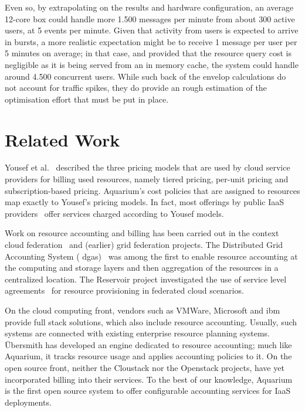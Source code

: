 \documentclass[letterpaper,twocolumn,10pt]{article}
\begin{document}
Even so, by extrapolating on the results and hardware configuration, an average
12-core box could handle more 1.500 messages per minute from about 300 active
users, at 5 events per minute. Given that activity from users is expected to
arrive in bursts, a more realistic expectation might be to receive 1 message
per user per 5 minutes on average; in that case, and provided that the resource
query cost is negligible as it is being served from an in memory cache, the
system could handle around 4.500 concurrent users. While such back of the
envelop calculations do not account for traffic spikes, they do provide an
rough estimation of the optimisation effort that must be put in place. 

\section{Related Work}

Yousef et al.~\cite{Youse08} described the three pricing models that
are used by cloud service providers for billing used resources, namely
tiered pricing, per-unit pricing and subscription-based pricing.
Aquarium's cost policies that are assigned to resources map exactly to
Yousef's pricing models. In fact, most offerings by public IaaS
providers~\cite{Azure12, Amaz12} offer services charged according to
Yousef models.

Work on resource accounting and billing has been carried out in the
context cloud federation~\cite{Rochw09, Elmro09} and (earlier) grid
federation projects. The Distributed Grid Accounting System ({\sc
  dgas})~\cite{Piro06} was among the first to enable resource
accounting at the computing and storage layers and then aggregation of
the resources in a centralized location. The Reservoir project
investigated the use of service level agreements~\cite{Elmro09} for
resource provisioning in federated cloud scenarios.

On the cloud computing front, vendors such as VMWare, Microsoft and
{\sc ibm} provide full stack solutions, which also include resource
accounting. Usually, such systems are connected with existing
enterprise resource planning systems. \"Ubersmith has developed an
engine dedicated to resource accounting; much like Aquarium, it tracks
resource usage and applies accounting policies to it. On the open
source front, neither the Cloustack nor the Openstack projects, have
yet incorporated billing into their services. To the best of our
knowledge, Aquarium is the first open source system to offer
configurable accounting services for IaaS deployments.
\end{document}
